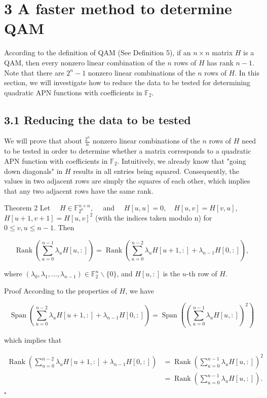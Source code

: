 \documentclass[10pt]{article}
\begin{document}
\section*{3 A faster method to determine QAM}
According to the definition of QAM (See Definition 5), if an $n \times n$ matrix $H$ is a QAM, then every nonzero linear combination of the $n$ rows of $H$ has rank $n-1$. Note that there are $2^{n}-1$ nonzero linear combinations of the $n$ rows of $H$. In this section, we will investigate how to reduce the data to be tested for determining quadratic APN functions with coefficients in $\mathbb{F}_{2}$.

\subsection*{3.1 Reducing the data to be tested}
We will prove that about $\frac{2^{n}}{n}$ nonzero linear combinations of the $n$ rows of $H$ need to be tested in order to determine whether a matrix corresponds to a quadratic APN function with coefficients in $\mathbb{F}_{2}$. Intuitively, we already know that "going down diagonals" in $H$ results in all entries being squared. Consequently, the values in two adjacent rows are simply the squares of each other, which implies that any two adjacent rows have the same rank.

Theorem 2 Let $\quad H \in \mathbb{F}_{2^{n}}^{n \times n}, \quad$ and $\quad H[u, u]=0, \quad H[u, v]=H[v, u]$, $H[u+1, v+1]=H[u, v]^{2}$ (with the indices taken modulo n) for $0 \leq v, u \leq n-1$. Then


\begin{equation*}
\operatorname{Rank}\left(\sum_{u=0}^{n-1} \lambda_{u} H[u,:]\right)=\operatorname{Rank}\left(\sum_{u=0}^{n-2} \lambda_{u} H[u+1,:]+\lambda_{n-1} H[0,:]\right), \tag{3}
\end{equation*}


where $\left(\lambda_{0}, \lambda_{1}, \ldots, \lambda_{n-1}\right) \in \mathbb{F}_{2}^{n} \backslash\{0\}$, and $H[u,:]$ is the $u$-th row of $H$.

Proof According to the properties of $H$, we have

$$
\operatorname{Span}\left(\sum_{u=0}^{n-2} \lambda_{u} H[u+1,:]+\lambda_{n-1} H[0,:]\right)=\operatorname{Span}\left(\left(\sum_{u=0}^{n-1} \lambda_{u} H[u,:]\right)^{2}\right)
$$

which implies that

$$
\begin{aligned}
\operatorname{Rank}\left(\sum_{u=0}^{n-2} \lambda_{u} H[u+1,:]+\lambda_{n-1} H[0,:]\right) & =\operatorname{Rank}\left(\sum_{u=0}^{n-1} \lambda_{u} H[u,:]\right)^{2} \\
& =\operatorname{Rank}\left(\sum_{u=0}^{n-1} \lambda_{u} H[u,:]\right) .
\end{aligned}
$$ \(\square\)
\end{document}

